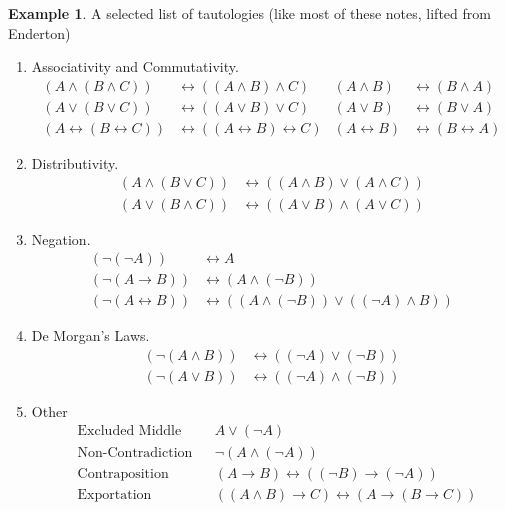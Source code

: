 \documentclass[12pt]{article}
\theoremstyle{definition}
\newtheorem{example}[theorem]{Example}
\newcommand{\<}{\langle}
\renewcommand{\>}{\rangle}
\newcommand{\liff}{\leftrightarrow}
\begin{document}
\begin{example}
    A selected list of tautologies (like most of these notes, lifted from Enderton)
    \begin{enumerate}
        \item Associativity and Commutativity.
        \begin{align*}
            (A \land (B \land C)) &\liff ((A \land B) \land C)
                & (A \land B) &\liff (B \land A) \\
            (A \lor (B \lor C)) &\liff ((A \lor B) \lor C)
                & (A \lor B) &\liff (B \lor A) \\
            (A \liff (B \liff C)) &\liff ((A \liff B) \liff C)
                & (A \liff B) &\liff (B \liff A)
        \end{align*}
        \item Distributivity.
        \begin{align*}
            (A \land (B \lor C)) &\liff ((A \land B) \lor (A \land C)) \\
            (A \lor (B \land C)) &\liff ((A \lor B) \land (A \lor C))
        \end{align*}
        \item Negation.
        \begin{align*}
            (\lnot(\lnot A)) &\liff A \\
            (\lnot(A \to B)) &\liff (A \land (\lnot B)) \\
            (\lnot(A \liff B)) &\liff ((A \land (\lnot B)) \lor ((\lnot A) \land B))
        \end{align*}
        \item De Morgan's Laws.
        \begin{align*}
            (\lnot(A \land B)) &\liff ((\lnot A) \lor (\lnot B)) \\
            (\lnot(A \lor B)) &\liff ((\lnot A) \land (\lnot B))
        \end{align*}
        \item Other
        \begin{align*}
            &\text{Excluded Middle} && A \lor (\lnot A) \\
            &\text{Non-Contradiction} && \lnot(A \land (\lnot A)) \\
            &\text{Contraposition} && (A \to B) \liff ((\lnot B) \to (\lnot A)) \\
            &\text{Exportation} && ((A \land B) \to C) \liff (A \to (B \to C))
        \end{align*}
    \end{enumerate}
\end{example}
\end{document}
